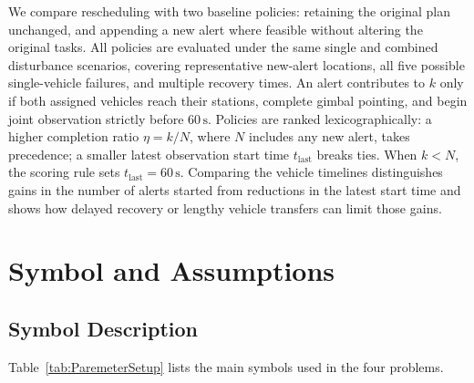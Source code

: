 \documentclass{swmcmthesis}
\begin{document}
We compare rescheduling with two baseline policies: retaining the original plan unchanged, and appending a new alert where feasible without altering the original tasks. All policies are evaluated under the same single and combined disturbance scenarios, covering representative new-alert locations, all five possible single-vehicle failures, and multiple recovery times. An alert contributes to \(k\) only if both assigned vehicles reach their stations, complete gimbal pointing, and begin joint observation strictly before \(60\,\mathrm{s}\). Policies are ranked lexicographically: a higher completion ratio \(\eta=k/N\), where \(N\) includes any new alert, takes precedence; a smaller latest observation start time \(t_{\mathrm{last}}\) breaks ties. When \(k<N\), the scoring rule sets \(t_{\mathrm{last}}=60\,\mathrm{s}\). Comparing the vehicle timelines distinguishes gains in the number of alerts started from reductions in the latest start time and shows how delayed recovery or lengthy vehicle transfers can limit those gains.

\section{Symbol and Assumptions}
\subsection{Symbol Description}

Table~\ref{tab:ParemeterSetup} lists the main symbols used in the four problems.
\end{document}
